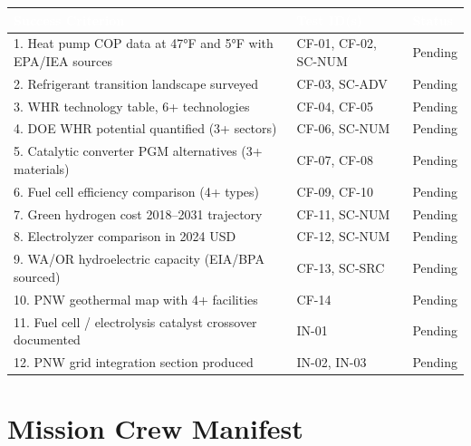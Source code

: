 \documentclass[11pt,letterpaper]{article}
\newcommand{\tableheader}[1]{\textbf{\sffamily\textcolor{white}{#1}}}
\begin{document}
\begin{center}
\begin{tabularx}{\textwidth}{XL{3.5cm}C{1.5cm}}
\toprule
{}
\tableheader{Success Criterion} & \tableheader{Test ID(s)} & \tableheader{Status} \\
. Heat pump COP data at 47°F and 5°F with EPA/IEA sources & CF-01, CF-02, SC-NUM & Pending \\
2. Refrigerant transition landscape surveyed & CF-03, SC-ADV & Pending \\
3. WHR technology table, 6+ technologies & CF-04, CF-05 & Pending \\
4. DOE WHR potential quantified (3+ sectors) & CF-06, SC-NUM & Pending \\
5. Catalytic converter PGM alternatives (3+ materials) & CF-07, CF-08 & Pending \\
6. Fuel cell efficiency comparison (4+ types) & CF-09, CF-10 & Pending \\
7. Green hydrogen cost 2018--2031 trajectory & CF-11, SC-NUM & Pending \\
8. Electrolyzer comparison in 2024 USD & CF-12, SC-NUM & Pending \\
9. WA/OR hydroelectric capacity (EIA/BPA sourced) & CF-13, SC-SRC & Pending \\
10. PNW geothermal map with 4+ facilities & CF-14 & Pending \\
11. Fuel cell / electrolysis catalyst crossover documented & IN-01 & Pending \\
12. PNW grid integration section produced & IN-02, IN-03 & Pending \\
\bottomrule
\end{tabularx}
\end{center}

\section{Mission Crew Manifest}
\end{document}
